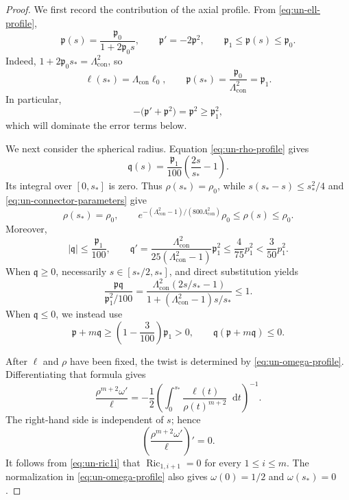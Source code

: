 \documentclass[11pt,reqno]{amsart}
\theoremstyle{definition}
\numberwithin{equation}{section}
\DeclareMathOperator{\Ric}{Ric}
\newcommand{\dd}{\mathop{}\!\mathrm d}
\begin{document}
\begin{proof}
We first record the contribution of the axial profile.  From
\eqref{eq:un-ell-profile},
\[
 \mathfrak p(s)=\frac{\mathfrak p_0}{1+2\mathfrak p_0s},
 \qquad
 \mathfrak p'=-2\mathfrak p^2,
 \qquad
 \mathfrak p_1\le\mathfrak p(s)\le\mathfrak p_0.
\]
Indeed, \(1+2\mathfrak p_0s_*=\Lambda_{\mathrm{con}}^2\), so
\[
 \ell(s_*)=\Lambda_{\mathrm{con}}\ell_0,
 \qquad
 \mathfrak p(s_*)=
 \frac{\mathfrak p_0}{\Lambda_{\mathrm{con}}^2}=\mathfrak p_1.
\]
In particular,
\[
 -\bigl(\mathfrak p'+\mathfrak p^2\bigr)=\mathfrak p^2
 \ge\mathfrak p_1^2,
\]
which will dominate the error terms below.

We next consider the spherical radius.  Equation
\eqref{eq:un-rho-profile} gives
\[
 \mathfrak q(s)=\frac{\mathfrak p_1}{100}
 \left(\frac{2s}{s_*}-1\right).
\]
Its integral over \([0,s_*]\) is zero.  Thus \(\rho(s_*)=\rho_0\),
while \(s(s_*-s)\le s_*^2/4\) and
\eqref{eq:un-connector-parameters} give
\begin{equation}\label{eq:un-rho-bound}
 \rho(s_*)=\rho_0,
 \qquad
 e^{-(\Lambda_{\mathrm{con}}^2-1)/
       (800\Lambda_{\mathrm{con}}^2)}\rho_0
 \le\rho(s)\le\rho_0.
\end{equation}
Moreover,
\[
 |\mathfrak q|\le\frac{\mathfrak p_1}{100},
 \qquad
 \mathfrak q'=
 \frac{\Lambda_{\mathrm{con}}^2}
 {25(\Lambda_{\mathrm{con}}^2-1)}\mathfrak p_1^2
\le\frac{4}{75}p_1^2
 <\frac{3}{50}p_1^2.
\]
When \(\mathfrak q\ge0\), necessarily
\(s\in[s_*/2,s_*]\), and direct substitution yields
\[
 \frac{\mathfrak p\mathfrak q}{\mathfrak p_1^2/100}
 =\frac{\Lambda_{\mathrm{con}}^2(2s/s_*-1)}
 {1+(\Lambda_{\mathrm{con}}^2-1)s/s_*}\le1.
\]
When \(\mathfrak q\le0\), we instead use
\[
 \mathfrak p+m\mathfrak q
 \ge\left(1-\frac3{100}\right)\mathfrak p_1>0,
 \qquad
 \mathfrak q(\mathfrak p+m\mathfrak q)\le0.
\]

After \(\ell\) and \(\rho\) have been fixed, the twist is determined by
\eqref{eq:un-omega-profile}.  Differentiating that formula gives
\[
 \frac{\rho^{m+2}\omega'}{\ell}
 =-\frac12\left(\int_0^{s_*}
       \frac{\ell(t)}{\rho(t)^{m+2}}\dd t\right)^{-1}.
\]
The right-hand side is independent of \(s\); hence
\begin{equation}\label{eq:un-mixed-cancellation}
 \left(\frac{\rho^{m+2}\omega'}{\ell}\right)'=0.
\end{equation}
It follows from \eqref{eq:un-ric1i} that
\(\Ric_{1,i+1}=0\) for every \(1\le i\le m\).  The normalization in
\eqref{eq:un-omega-profile} also gives
\(\omega(0)=1/2\) and \(\omega(s_*)=0\).


\end{proof}
\end{document}
